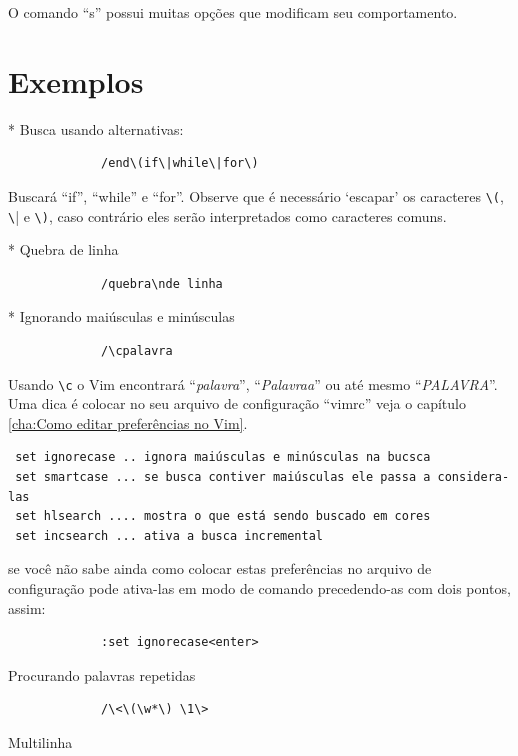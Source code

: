 \documentclass[10pt,a4paper,openany]{book}
\begin{document}
O comando ``s'' possui muitas opções que modificam seu comportamento.

\section{Exemplos }
\label{Exemplos }

* Busca usando alternativas:

\begin{verbatim}
			 /end\(if\|while\|for\)
\end{verbatim}

Buscará ``if'', ``while'' e ``for''.  Observe que é necessário `escapar' os
caracteres \verb|\(|, \verb|\|| e \verb|\)|, caso contrário eles serão
interpretados como caracteres comuns.

* Quebra de linha

\begin{verbatim}
			 /quebra\nde linha
\end{verbatim}

* Ignorando maiúsculas e minúsculas

\begin{verbatim}
			 /\cpalavra
\end{verbatim}

Usando \verb|\c| o Vim encontrará ``{\em{palavra}}'', ``{\em{Palavraa}}'' ou
até mesmo ``{\em{PALAVRA}}''. Uma dica é colocar no seu arquivo de
configuração ``vimrc'' veja o capítulo \ref{cha:Como editar preferências no Vim}.

\begin{verbatim}
 set ignorecase .. ignora maiúsculas e minúsculas na bucsca
 set smartcase ... se busca contiver maiúsculas ele passa a considera-las
 set hlsearch .... mostra o que está sendo buscado em cores
 set incsearch ... ativa a busca incremental
\end{verbatim}

se você não sabe ainda como colocar estas preferências no arquivo de configuração pode
ativa-las em modo de comando precedendo-as com dois pontos, assim:

\begin{verbatim}
			 :set ignorecase<enter>
\end{verbatim}

Procurando palavras repetidas

\begin{verbatim}
			 /\<\(\w*\) \1\>
\end{verbatim}

Multilinha
\end{document}
